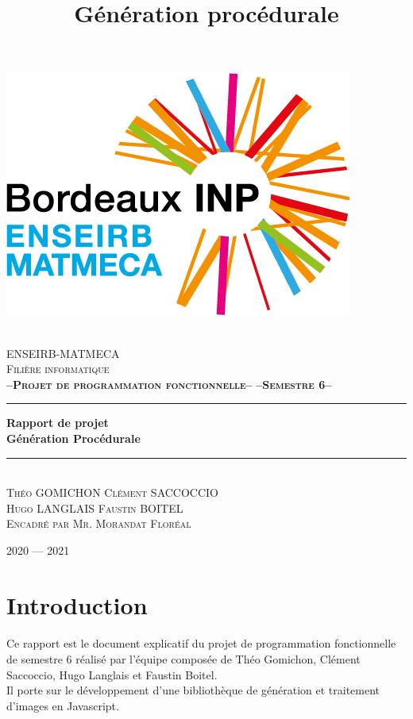 \documentclass{article}
\title{Génération procédurale}
\author{}
\date{}
\newcommand{\HRule}{\rule{\linewidth}{0.5mm}}
\begin{document}
\begin{titlepage}
    \begin{center}
	    \includegraphics[scale=0.5]{logo.jpg}

        \textsc{\LARGE\\[0.5cm]ENSEIRB-MATMECA}
        \\[0.5cm]
        \textsc{\LARGE Filière informatique}
        \\[2cm]

        \textbf{\LARGE \textsc{--Projet de programmation fonctionnelle--}}
        \textbf{\LARGE \textsc{--Semestre 6--}}
        	
        \HRule
        { \huge \textbf{Rapport de projet\\Génération Procédurale}}
        \\[0.25cm]
        \HRule
        \\[1.5cm]
    
    	\textsc{\Large Théo GOMICHON\qquad}
    	\textsc{\Large Clément SACCOCCIO}\\[0.5cm]
    	\textsc{\Large Hugo LANGLAIS\qquad}
    	\textsc{\Large Faustin BOITEL}\\[0.5cm]
    	\textsc{\large Encadré par Mr. Morandat Floréal}
        \vfill
       
        {\large \textsc{2020 — 2021}}
    \end{center}
\end{titlepage}

\section*{Introduction}
\paragraph{}
Ce rapport est le document explicatif du projet de programmation fonctionnelle de semestre 6 réalisé par l'équipe composée de Théo Gomichon, Clément Saccoccio, Hugo Langlais et Faustin Boitel. \\
Il porte sur le développement d'une bibliothèque de génération et traitement d'images en \textsf{Javascript}.
\end{document}
